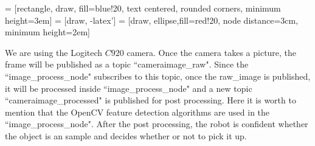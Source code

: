 \documentclass{paper}
\begin{document}
 = [rectangle, draw, fill=blue!20, 
     text centered, rounded corners, minimum height=3em]
 = [draw, -latex']
 = [draw, ellipse,fill=red!20, node distance=3cm,
    minimum height=2em]
We are using the Logitech $C920$ camera. Once the camera takes a picture, the frame will be published as a topic ``\/camera\/image\_raw". 
Since the ``image\_process\_node" subscribes to this topic, once the raw\_image is published, it will be processed inside ``image\_process\_node" and a new topic ``\/camera\/image\_processed" is published for post processing. Here it is worth to mention that the OpenCV feature detection algorithms are used in the ``image\_process\_node". After the post processing, the robot is confident whether the object is an sample and decides whether or not to pick it up.   
\end{document}
